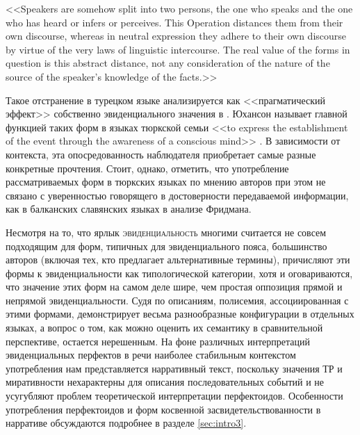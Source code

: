 \begin{displayquote}
<<Speakers are somehow split into two persons, the one who speaks and the one who has heard or infers or perceives. This Operation distances them from their own discourse, whereas in neutral expression they adhere to their own discourse by virtue of the very laws of linguistic intercourse. The real value of the forms in question is this abstract distance, not any consideration of the nature of the source of the speaker's knowledge of the facts.>> \\
\citep[95]{lazard1999}
\end{displayquote}

Такое отстранение в турецком языке анализируется как <<прагматический эффект>> собственно эвиденциального значения в \citep[162--163]{slobinaksukoc1986}. Юхансон называет главной функцией таких форм в языках тюркской семьи <<to express the establishment of the event through the awareness of a conscious mind>> \citep[71]{johanson2000}. В зависимости от контекста, эта опосредованность наблюдателя приобретает самые разные конкретные прочтения. Стоит, однако, отметить, что употребление рассматриваемых форм в тюркских языках по мнению авторов при этом не связано с уверенностью говорящего в достоверности передаваемой информации, как в балканских славянских языках в анализе Фридмана.
\par Несмотря на то, что ярлык \textsc{эвиденциальность} многими считается не совсем подходящим для форм, типичных для эвиденциального пояса, большинство авторов (включая тех, кто предлагает альтернативные термины), причисляют эти формы к эвиденциальности как типологической категории, хотя и оговариваются, что значение этих форм на самом деле шире, чем простая оппозиция прямой и непрямой эвиденциальности. Судя по описаниям, полисемия, ассоциированная с этими формами, демонстрирует весьма разнообразные конфигурации в отдельных языках, а вопрос о том, как можно оценить их семантику в сравнительной перспективе, остается нерешенным. На фоне различных интерпретаций эвиденциальных перфектов в речи наиболее стабильным контекстом употребления нам представляется нарративный текст, поскольку значения ТР и миративности нехарактерны для описания последовательных событий и не усугубляют проблем теоретической интерпретации перфектоидов.
Особенности употребления перфектоидов и форм косвенной засвидетельствованности в нарративе обсуждаются подробнее в разделе \ref{sec:intro3}.

